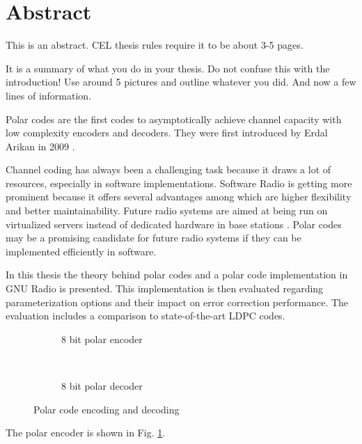 \chapter*{Abstract}
This is an abstract.
CEL thesis rules require it to be about 3-5 pages. 

It is a summary of what you do in your thesis. Do not confuse this with the introduction!
Use around 5 pictures and outline whatever you did.
And now a few lines of information.


Polar codes are the first codes to asymptotically achieve channel capacity with low complexity encoders and decoders.
They were first introduced by Erdal Arikan in 2009 \cite{polar:arikan09}.

Channel coding has always been a challenging task because it draws a lot of resources, especially in software implementations.
Software Radio is getting more prominent because it offers several advantages among which are higher flexibility and better maintainability.
Future radio systems are aimed at being run on virtualized servers instead of dedicated hardware in base stations \cite{cloudran:2015}.
Polar codes may be a promising candidate for future radio systems if they can be implemented efficiently in software.

In this thesis the theory behind polar codes and a polar code implementation in GNU Radio is presented.
This implementation is then evaluated regarding parameterization options and their impact on error correction performance.
The evaluation includes a comparison to state-of-the-art \ac{LDPC} codes.





















\begin{figure}[!htb]
  \begin{subfigure}[t]{.49\textwidth}
    \begin{center}
      \def\dist{1.5}
      \def\power{3}
      
      \caption{8 bit polar encoder}
      \label{abs:polar_8bit_encoder_natural}
    \end{center}
  \end{subfigure}\,%
  \begin{subfigure}[t]{.49\textwidth}
    \begin{center}
      \def\dist{1.5}
      \def\power{3}
      
      \caption{8 bit polar decoder}
      \label{abs:polar_8bit_decoder}
    \end{center}
  \end{subfigure}%
  \caption{Polar code encoding and decoding}
  \label{abs:encoder-decoder}
\end{figure}

The polar encoder is shown in Fig. \ref{abs:polar_8bit_encoder_natural}.

